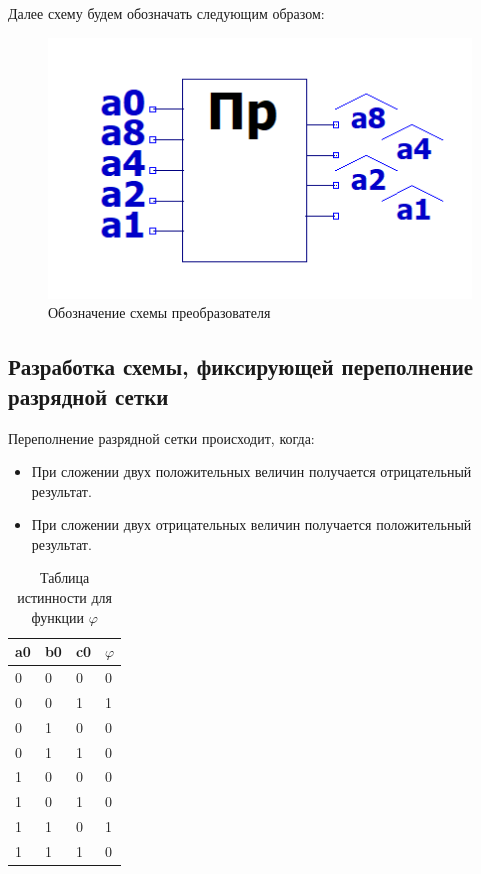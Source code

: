 \documentclass[a4paper,14pt]{article}
\begin{document}
Далее схему будем обозначать следующим образом:

\begin{figure}[H]
	\centering
	\includegraphics[width=0.3\linewidth]{schemas/pr_el}
	\caption{Обозначение схемы преобразователя}
	\label{fig:pr_el}
\end{figure}

\subsection{Разработка схемы, фиксирующей переполнение разрядной сетки}

Переполнение разрядной сетки происходит, когда:
\begin{itemize}
	\item При сложении двух положительных величин получается отрицательный результат.
	
	\item При сложении двух отрицательных величин получается положительный результат.	
\end{itemize}

\begin{table}[H]
	\begin{center}
		\caption{\label{tab:perSet} Таблица истинности для функции $\varphi$}
		
		\begin{tabular}{|l|l|l|l|}
			\hline
			a0 & b0 & c0 & $\varphi$ \\ \hline
			0  & 0  & 0  & 0  \\ \hline
			0  & 0  & 1  & 1  \\ \hline
			0  & 1  & 0  & 0  \\ \hline
			0  & 1  & 1  & 0  \\ \hline
			1  & 0  & 0  & 0  \\ \hline
			1  & 0  & 1  & 0  \\ \hline
			1  & 1  & 0  & 1  \\ \hline
			1  & 1  & 1  & 0  \\ \hline
		\end{tabular}
	\end{center}
\end{table}
\end{document}
